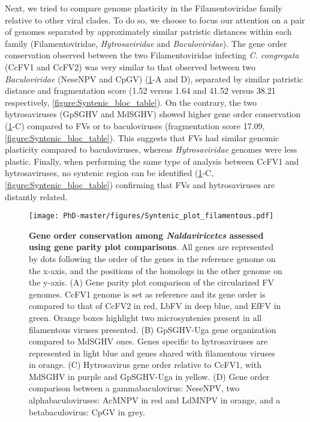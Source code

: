 Next, we tried to compare genome plasticity in the Filamentoviridae family relative to other viral clades. To do so, we choose to focus our attention on a pair of genomes separated by approximately similar patristic distances within each family (Filamentoviridae, \textit{Hytrosaviridae} and \textit{Baculoviridae}). The gene order conservation observed between the two Filamentoviridae infecting \textit{C. congregata} (CcFV1 and CcFV2) was very similar to that observed between two \textit{Baculoviridae} (NeseNPV and CpGV) (\figurename{\ref{figure:Syntenic_plot_filamentous}}-A and D), separated by similar patristic distance and fragmentation score (1.52 versus 1.64 and 41.52 versus 38.21 respectively, \figurename{\ref{figure:Syntenic_bloc_table}}). On the contrary, the two hytrosaviruses (GpSGHV and MdSGHV) showed higher gene order conservation (\figurename{\ref{figure:Syntenic_plot_filamentous}}-C) compared to FVs or to baculoviruses (fragmentation score 17.09, \figurename{\ref{figure:Syntenic_bloc_table}}). This suggests that FVs had similar genomic plasticity compared to baculoviruses, whereas \textit{Hytrosaviridae} genomes were less plastic. Finally, when performing the same type of analysis between CcFV1 and hytrosaviruses, no syntenic region can be identified (\figurename{\ref{figure:Syntenic_plot_filamentous}}-C, \figurename{\ref{figure:Syntenic_bloc_table}}) confirming that FVs and hytrosaviruses are distantly related.  

 \begin{figure}[H]
\texttt{[image: PhD-master/figures/Syntenic\_plot\_filamentous.pdf]}\centering
\caption[Paper2:Gene order conservation among \textit{Naldaviricetes}]{\textbf{Gene order conservation among \textit{Naldaviricetes} assessed using gene parity plot comparisons}. All genes are represented by dots following the order of the genes in the reference genome on the x-axis, and the positions of the homologs in the other genome on the y-axis. (A) Gene parity plot comparison of the circularized FV genomes. CcFV1 genome is set as reference and its gene order is compared to that of CcFV2 in red, LbFV in deep blue, and EfFV in green. Orange boxes highlight two microsyntenies present in all filamentous viruses presented. (B) GpSGHV-Uga gene organization compared to MdSGHV ones. Genes specific to hytrosaviruses are represented in light blue and genes shared with filamentous viruses in orange. (C) Hytrosavirus gene order relative to CcFV1, with MdSGHV in purple and GpSGHV-Uga in yellow. (D) Gene order comparison between a gammabaculovirus: NeseNPV, two alphabaculoviruses: AcMNPV in red and LdMNPV in orange, and a betabaculovirus: CpGV in grey.}
\label{figure:Syntenic_plot_filamentous}
\end{figure}


